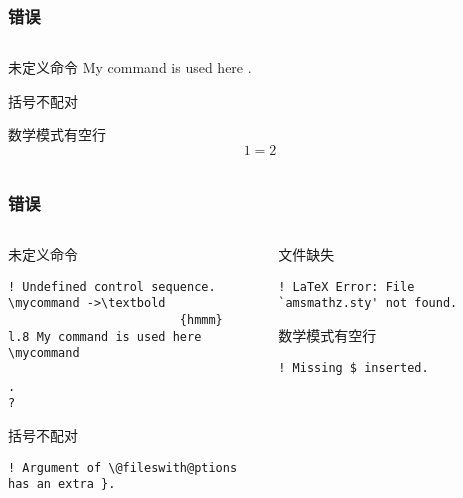 \begin{frame}[fragile]
  \frametitle{错误}
  \begin{columns}
    \begin{column}{0.55\textwidth}
      \begin{codeblock}[]{未定义命令}
\newcommand\mycommand{}
My command is used here \mycommand.
      \end{codeblock}
      \begin{codeblock}[]{括号不配对}
\usepackage[leqno}{amsmath}
      \end{codeblock}
    \end{column}
    \begin{column}{0.45\textwidth}
      \begin{codeblock}[]{文件缺失}
\usepackage{amsmathz}
      \end{codeblock}
      \begin{codeblock}[]{数学模式有空行}
\begin{equation}

  1=2

\end{equation}
      \end{codeblock}
    \end{column}
  \end{columns}
\end{frame}

\begin{frame}[fragile]
  \frametitle{错误}
  \begin{columns}
    \begin{column}{0.55\textwidth}
      \begin{block}{未定义命令}
        \begin{lstlisting}
! Undefined control sequence.
\mycommand ->\textbold 
                        {hmmm}
l.8 My command is used here \mycommand
                                      .
? 
        \end{lstlisting}
      \end{block}
      \begin{block}{括号不配对}
        \begin{lstlisting}
! Argument of \@fileswith@ptions has an extra }.
        \end{lstlisting}
      \end{block}
    \end{column}
    \begin{column}{0.45\textwidth}
      \begin{block}{文件缺失}
        \begin{lstlisting}
! LaTeX Error: File `amsmathz.sty' not found.
        \end{lstlisting}
      \end{block}
      \begin{block}{数学模式有空行}
        \begin{lstlisting}
! Missing $ inserted.
        \end{lstlisting}
      \end{block}
    \end{column}
  \end{columns}
\end{frame}

